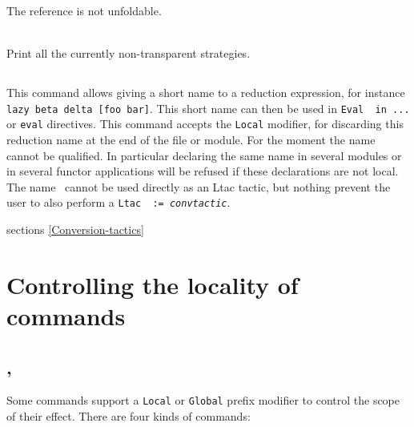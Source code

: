 \begin{ErrMsgs}
\item The reference is not unfoldable.
\end{ErrMsgs}

\begin{Variants}
\item {}\\
  Print all the currently non-transparent strategies.
\end{Variants}

\subsection{}

This command allows giving a short name to a reduction expression,
for instance {\tt lazy beta delta [foo bar]}. This short name can
then be used in {\tt Eval \ident\ in ...} or {\tt eval} directives.
This command accepts the {\tt Local} modifier, for discarding
this reduction name at the end of the file or module. For the moment
the name cannot be qualified. In particular declaring the same name
in several modules or in several functor applications will be refused
if these declarations are not local. The name \ident\ cannot be used
directly as an Ltac tactic, but nothing prevent the user to also
perform a {\tt Ltac \ident\ := {\rm\sl convtactic}}.

\SeeAlso sections \ref{Conversion-tactics}

\section{Controlling the locality of commands}

\subsection{{}, {}
}

Some commands support a {\tt Local} or {\tt Global} prefix modifier to
control the scope of their effect. There are four kinds of commands:

